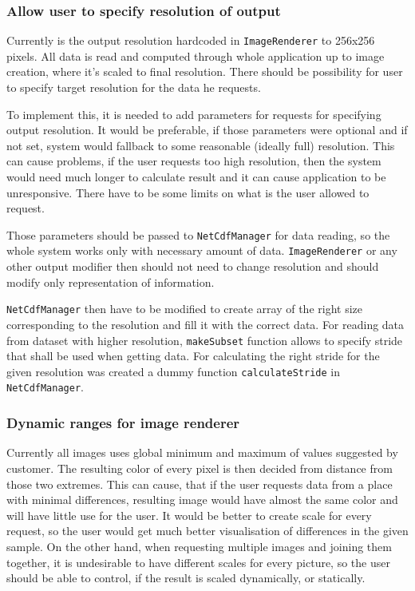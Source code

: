 \documentclass[11pt,a4paper,titlepage,oneside]{report}
\begin{document}
\subsubsection{Allow user to specify resolution of output}
Currently is the output resolution hardcoded in \texttt{ImageRenderer} to 256x256 pixels. All data is read and computed through whole application up to image creation, where it's scaled to final resolution. There should be possibility for user to specify target resolution for the data he requests.

To implement this, it is needed to add parameters for requests for specifying output resolution. It would be preferable, if those parameters were optional and if not set, system would fallback to some reasonable (ideally full) resolution. This can cause problems, if the user requests too high resolution, then the system would need much longer to calculate result and it can cause application to be unresponsive. There have to be some limits on what is the user allowed to request.

Those parameters should be passed to \texttt{NetCdfManager} for data reading, so the whole system works only with necessary amount of data. \texttt{ImageRenderer} or any other output modifier then should not need to change resolution and should modify only representation of information.

\texttt{NetCdfManager} then have to be modified to create array of the right size corresponding to the resolution and fill it with the correct data. For reading data from dataset with higher resolution, \texttt{makeSubset} function allows to specify stride that shall be used when getting data. For calculating the right stride for the given resolution was created a dummy function \texttt{calculateStride} in \texttt{NetCdfManager}.

\subsubsection{Dynamic ranges for image renderer}
Currently all images uses global minimum and maximum of values suggested by customer. The resulting color of every pixel is then decided from distance from those two extremes. This can cause, that if the user requests data from a place with minimal differences, resulting image would have almost the same color and will have little use for the user. It would be better to create scale for every request, so the user would get much better visualisation of differences in the given sample. On the other hand, when requesting multiple images and joining them together, it is undesirable to have different scales for every picture, so the user should be able to control, if the result is scaled dynamically, or statically.
\end{document}
